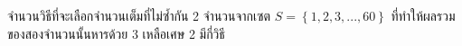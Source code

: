 ﻿%
\question จำนวนวิธีที่จะเลือกจำนวนเต็มที่ไม่ซ้ำกัน 2 จำนวนจากเซต $S=\left\{1, 2, 3, ..., 60\right\} $ ที่ทำให้ผลรวมของสองจำนวนนั้นหารด้วย 3 เหลือเศษ 2 มีกี่วิธี
\newline
{}
